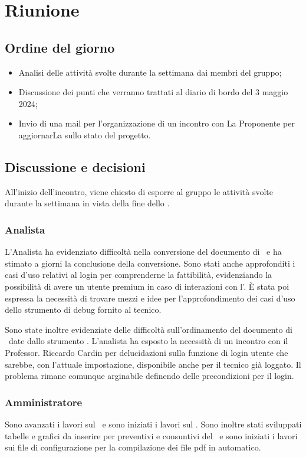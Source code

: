 \section{Riunione}
\subsection{Ordine del giorno}
\begin{itemize}
	\item Analisi delle attività svolte durante la settimana dai membri del gruppo;
	\item Discussione dei punti che verranno trattati al diario di bordo del 3 maggio 2024;
	\item Invio di una mail per l'organizzazione di un incontro con La Proponente per aggiornarLa sullo stato del progetto.
\end{itemize}

\subsection{Discussione e decisioni}
\par All'inizio dell'incontro, viene chiesto di esporre al gruppo le attività svolte durante la settimana in vista della fine dello .
\subsubsection{Analista}
\par L'Analista ha evidenziato difficoltà nella conversione del documento di \AdR\ e ha stimato a giorni la conclusione della conversione. Sono stati anche approfonditi i casi d'uso relativi al login per comprenderne la fattibilità, evidenziando la possibilità di avere un utente premium in caso di interazioni con l'. È stata poi espressa la necessità di trovare mezzi e idee per l'approfondimento dei casi d'uso dello strumento di debug fornito al tecnico.
\par Sono state inoltre evidenziate delle difficoltà sull'ordinamento del documento di \AdR\ date dallo strumento . L'analista ha esposto la necessità di un incontro con il Professor. Riccardo Cardin per delucidazioni sulla funzione di login utente che sarebbe, con l'attuale impostazione, disponibile anche per il tecnico già loggato. Il problema rimane comunque arginabile definendo delle precondizioni per il login. 
\subsubsection{Amministratore}
\par Sono avanzati i lavori sul \PdP\ e sono iniziati i lavori sul \PdQ. Sono inoltre stati sviluppati tabelle e grafici da inserire per preventivi e consuntivi del \PdP\ e sono iniziati i lavori sui file di configurazione per la compilazione dei file pdf in automatico.
